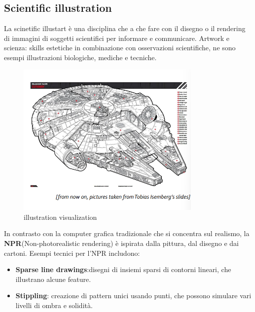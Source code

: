 \subsection{Scientific illustration}
La scinetific illustart è una disciplina che a che fare con il disegno o il rendering di immagini di soggetti scientifici per informare e communicare.
Artwork e scienza: skills estetiche in combinazione con osservazioni scientifiche, ne sono esempi illustrazioni biologiche, mediche e tecniche. 
\begin{figure}[H]
    \centering
    \includegraphics[width=0.8\textwidth]{images/IllustScient.png} 
    \caption{illustration visualization}
    \label{fig:immagine}
\end{figure}  
In contrasto con la computer grafica tradizionale che si concentra sul realismo, la \textbf{NPR}(Non-photorealistic rendering) è ispirata dalla pittura, dal disegno e dai cartoni.
Esempi tecnici per l'NPR includono: 
\begin{itemize}
    \item \textbf{Sparse line drawings}:disegni di insiemi sparsi di contorni lineari, che illustrano alcune feature.
    \item \textbf{Stippling}: creazione di pattern unici usando punti, che possono simulare vari livelli di ombra e solidità.
\end{itemize}
